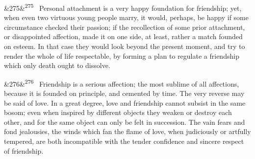 \documentclass[12pt]{article}
\newcommand{\para}[1][]{\par\noindent\ifx&#1&\else\textsuperscript{\footnotesize #1}~\fi}
\begin{document}
\para[275] Personal attachment is a very happy foundation for friendship; yet, when even two virtuous young people marry, it would, perhaps, be happy if some circumstance checked their passion; if the recollection of some prior attachment, or disappointed affection, made it on one side, at least, rather a match founded on esteem. In that case they would look beyond the present moment, and try to render the whole of life respectable, by forming a plan to regulate a friendship which only death ought to dissolve.

\para[276] Friendship is a serious affection; the most sublime of all affections, because it is founded on principle, and cemented by time. The very reverse may be said of love. In a great degree, love and friendship cannot subsist in the same bosom; even when inspired by different objects they weaken or destroy each other, and for the same object can only be felt in succession. The vain fears and fond jealousies, the winds which fan the flame of love, when judiciously or artfully tempered, are both incompatible with the tender confidence and sincere respect of friendship.
\end{document}
